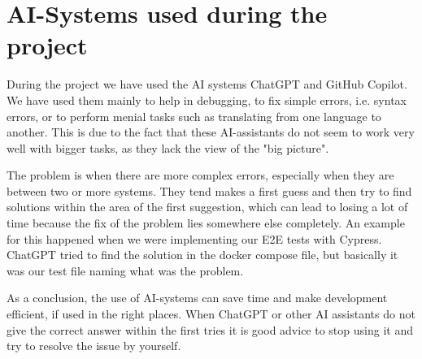 \section{AI-Systems used during the project}

During the project we have used the AI systems ChatGPT and GitHub Copilot.
We have used them mainly to help in debugging, to fix simple errors, i.e. syntax errors, or to perform menial tasks such as translating from one language to another.
This is due to the fact that these AI-assistants do not seem to work very well with bigger tasks, as they lack the view of the "big picture".

The problem is when there are more complex errors, especially when they are between two or more systems.
They tend makes a first guess and then try to find solutions within the area of the first suggestion, which can lead to losing a lot of time because the fix of the problem lies somewhere else completely.
An example for this happened when we were implementing our E2E tests with Cypress. ChatGPT tried to find the solution in the docker compose file, but basically it was our test file naming what was the problem.

As a conclusion, the use of AI-systems can save time and make development efficient, if used in the right places. When ChatGPT or other AI assistants do not give the correct answer within the first tries it is good advice to stop using it and try to resolve the issue by yourself.
